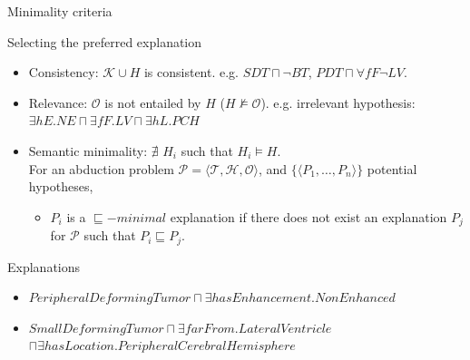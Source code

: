 \documentclass{beamer}
\begin{document}
\begin{frame}{Minimality criteria}
\begin{block}{Selecting the preferred explanation}
\begin{itemize}
  \item Consistency: $\mathcal{K}\cup H$ is consistent.  e.g. $SDT \sqcap \neg BT$, $PDT \sqcap \forall fF \neg LV$.
  \item Relevance: $\mathcal{O}$ is not entailed by $H$ ($H\nvDash \mathcal{O}$). e.g. irrelevant hypothesis: $\exists hE. NE \sqcap \exists fF. LV \sqcap \exists hL.PCH $
  \item Semantic minimality: $\nexists$ $H_i$ such that $H_i\vDash H$.\\
  For an abduction problem $\mathcal{P}=\langle \mathcal{T},\mathcal{H}, \mathcal{O}\rangle$, and $\{\langle P_{1},\dots,P_{n}\rangle\}$ potential hypotheses,
\begin{itemize}
\item  $P_{i}$ is a $\sqsubseteq -minimal$ explanation if there does not exist an explanation $P_{j}$ for $\mathcal{P}$ such that $P_{i}\sqsubseteq P_{j}$.
\end{itemize}
 \end{itemize}
\end{block}


% 
\begin{exampleblock}{Explanations}
 \begin{itemize}
 \item $PeripheralDeformingTumor \sqcap \exists hasEnhancement. NonEnhanced$
 \item $SmallDeformingTumor\sqcap \exists farFrom. LateralVentricle $\\ $\sqcap \exists hasLocation. PeripheralCerebralHemisphere$
\end{itemize}
\end{exampleblock}
\end{frame}
\end{document}
